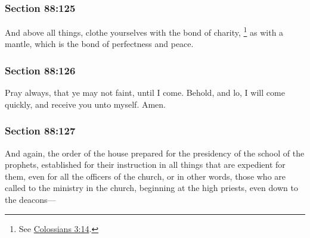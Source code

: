 	\subsubsection{Section 88:125} %
		\label{DC88-125}

		And above all things, clothe yourselves with the bond of charity,%
			\footnote{%
				See \hyperref[COLOSSIANS-3-14]{Colossians 3:14}.
				}
		as with a mantle, which is the bond of perfectness and peace.


	\subsubsection{Section 88:126} %
		\label{DC88-126}

		Pray always, that ye may not faint, until I come. Behold, and lo, I will come quickly, and receive you unto myself. Amen.


	\subsubsection{Section 88:127} %
		\label{DC88-127}

		And again, the order of the house prepared for the presidency of the school of the prophets, established for their instruction in all things that are expedient for them, even for all the officers of the church, or in other words, those who are called to the ministry in the church, beginning at the high priests, even down to the deacons---

